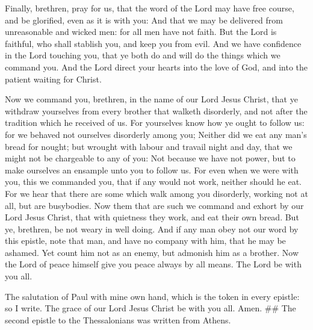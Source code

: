  Finally, brethren, pray for us, that the word of the Lord
may have free course, and be glorified, even as it is with you:
 And that we may be delivered from unreasonable and wicked
men: for all men have not faith.  But the Lord is
faithful, who shall stablish you, and keep you from evil. 
And we have confidence in the Lord touching you, that ye both do and
will do the things which we command you.  And the Lord
direct your hearts into the love of God, and into the patient waiting
for Christ.

 Now we command you, brethren, in the name of our Lord
Jesus Christ, that ye withdraw yourselves from every brother that
walketh disorderly, and not after the tradition which he received of us.
 For yourselves know how ye ought to follow us: for we
behaved not ourselves disorderly among you;  Neither did
we eat any man's bread for nought; but wrought with labour and travail
night and day, that we might not be chargeable to any of you:
 Not because we have not power, but to make ourselves an
ensample unto you to follow us.  For even when we were
with you, this we commanded you, that if any would not work, neither
should he eat.  For we hear that there are some which
walk among you disorderly, working not at all, but are busybodies.
 Now them that are such we command and exhort by our Lord
Jesus Christ, that with quietness they work, and eat their own bread.
 But ye, brethren, be not weary in well doing.
 And if any man obey not our word by this epistle, note
that man, and have no company with him, that he may be ashamed.
 Yet count him not as an enemy, but admonish him as a
brother.  Now the Lord of peace himself give you peace
always by all means. The Lord be with you all.

 The salutation of Paul with mine own hand, which is the
token in every epistle: so I write.  The grace of our
Lord Jesus Christ be with you all. Amen. \#\# The second epistle to the
Thessalonians was written from Athens.
